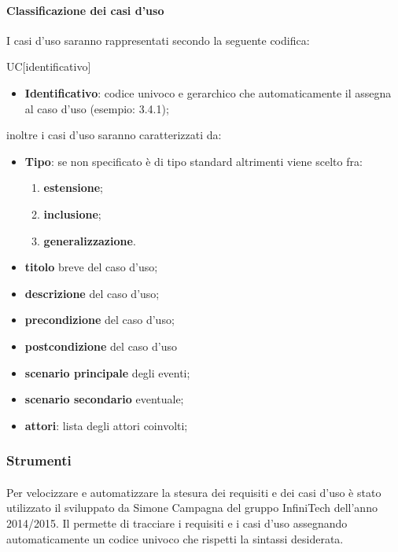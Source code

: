		\paragraph{Classificazione dei casi d'uso}
		I casi d'uso saranno rappresentati secondo la seguente codifica:
		\begin{center}
			UC[identificativo]
		\end{center}
		\begin{itemize}
			\item \textbf{Identificativo}: codice univoco e gerarchico che automaticamente il  assegna al caso d'uso (esempio: 3.4.1);
		\end{itemize}
		inoltre i casi d'uso saranno caratterizzati da:
		\begin{itemize}
			\item \textbf{Tipo}: se non specificato è di tipo standard altrimenti viene scelto fra:
			\begin{enumerate}
				\item \textbf{estensione};
				\item \textbf{inclusione};
				\item \textbf{generalizzazione}.
			\end{enumerate}
			\item \textbf{titolo} breve del caso d'uso;
			\item \textbf{descrizione} del caso d'uso;
			\item \textbf{precondizione} del caso d'uso;
			\item \textbf{postcondizione} del caso d'uso 
			\item \textbf{scenario principale} degli eventi;
			\item \textbf{scenario secondario} eventuale;
			\item \textbf{attori}: lista degli attori coinvolti;
		\end{itemize}
\subsubsection{Strumenti}
	\paragraph{}
	Per velocizzare e automatizzare la stesura dei requisiti e dei casi d'uso è stato utilizzato il  \textbf{} sviluppato da Simone Campagna del gruppo InfiniTech dell'anno 2014/2015. Il  permette di tracciare i requisiti e i casi d'uso assegnando automaticamente un codice univoco che rispetti la sintassi desiderata.